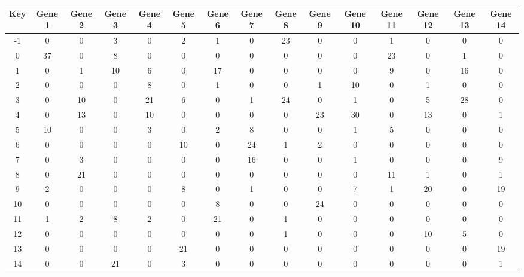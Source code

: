 \begin{tabular}{|c|c|c|c|c|c|c|c|c|c|c|c|c|c|c|}
\hline
Key & Gene 1 & Gene 2 & Gene 3 & Gene 4 & Gene 5 & Gene 6 & Gene 7 & Gene 8 & Gene 9 & Gene 10 & Gene 11 & Gene 12 & Gene 13 & Gene 14 \\
\hline
-1 & 0 & 0 & 3 & 0 & 2 & 1 & 0 & 23 & 0 & 0 & 1 & 0 & 0 & 0 \\
0 & 37 & 0 & 8 & 0 & 0 & 0 & 0 & 0 & 0 & 0 & 23 & 0 & 1 & 0 \\
1 & 0 & 1 & 10 & 6 & 0 & 17 & 0 & 0 & 0 & 0 & 9 & 0 & 16 & 0 \\
2 & 0 & 0 & 0 & 8 & 0 & 1 & 0 & 0 & 1 & 10 & 0 & 1 & 0 & 0 \\
3 & 0 & 10 & 0 & 21 & 6 & 0 & 1 & 24 & 0 & 1 & 0 & 5 & 28 & 0 \\
4 & 0 & 13 & 0 & 10 & 0 & 0 & 0 & 0 & 23 & 30 & 0 & 13 & 0 & 1 \\
5 & 10 & 0 & 0 & 3 & 0 & 2 & 8 & 0 & 0 & 1 & 5 & 0 & 0 & 0 \\
6 & 0 & 0 & 0 & 0 & 10 & 0 & 24 & 1 & 2 & 0 & 0 & 0 & 0 & 0 \\
7 & 0 & 3 & 0 & 0 & 0 & 0 & 16 & 0 & 0 & 1 & 0 & 0 & 0 & 9 \\
8 & 0 & 21 & 0 & 0 & 0 & 0 & 0 & 0 & 0 & 0 & 11 & 1 & 0 & 1 \\
9 & 2 & 0 & 0 & 0 & 8 & 0 & 1 & 0 & 0 & 7 & 1 & 20 & 0 & 19 \\
10 & 0 & 0 & 0 & 0 & 0 & 8 & 0 & 0 & 24 & 0 & 0 & 0 & 0 & 0 \\
11 & 1 & 2 & 8 & 2 & 0 & 21 & 0 & 1 & 0 & 0 & 0 & 0 & 0 & 0 \\
12 & 0 & 0 & 0 & 0 & 0 & 0 & 0 & 1 & 0 & 0 & 0 & 10 & 5 & 0 \\
13 & 0 & 0 & 0 & 0 & 21 & 0 & 0 & 0 & 0 & 0 & 0 & 0 & 0 & 19 \\
14 & 0 & 0 & 21 & 0 & 3 & 0 & 0 & 0 & 0 & 0 & 0 & 0 & 0 & 1 \\
\hline
\end{tabular}